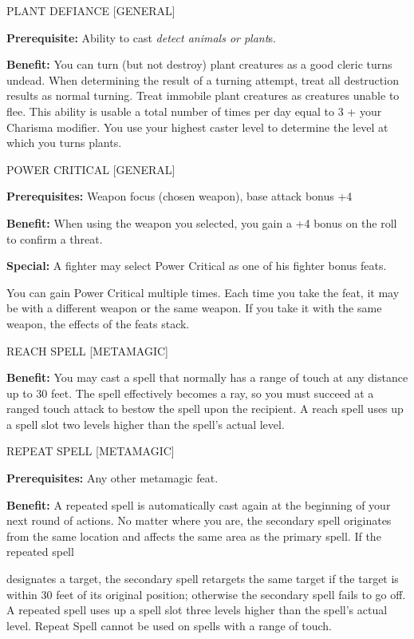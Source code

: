 \documentclass{article}
\begin{document}
\vspace{12pt}
PLANT DEFIANCE [GENERAL]

\textbf{Prerequisite:} Ability to cast \textit{detect animals or plant}s.

\textbf{Benefit:} You can turn (but not destroy) plant creatures as a good cleric 
turns undead. When determining the result of a turning attempt, treat all destruction 
results as normal turning. Treat immobile plant creatures as creatures unable to 
flee. This ability is usable a total number of times per day equal to 3 + your 
Charisma modifier. You use your highest caster level to determine the level at 
which you turns plants.

\vspace{12pt}
POWER CRITICAL [GENERAL]

\textbf{Prerequisites:} Weapon focus (chosen weapon), base attack bonus +4

\textbf{Benefit:} When using the weapon you selected, you gain a +4 bonus on the 
roll to confirm a threat.

\textbf{Special: }A fighter may select Power Critical as one of his fighter bonus 
feats.

You can gain Power Critical multiple times. Each time you take the feat, it may 
be with a different weapon or the same weapon.  If you take it with the same weapon, 
the effects of the feats stack.

\vspace{12pt}
REACH SPELL [METAMAGIC]

\textbf{Benefit:} You may cast a spell that normally has a range of touch at any 
distance up to 30 feet. The spell effectively becomes a ray, so you must succeed 
at a ranged touch attack to bestow the spell upon the recipient. A reach spell 
uses up a spell slot two levels higher than the spell's actual level.

\vspace{12pt}
REPEAT SPELL [METAMAGIC]

\textbf{Prerequisites:} Any other metamagic feat.

\textbf{Benefit:} A repeated spell is automatically cast again at the beginning 
of your next round of actions. No matter where you are, the secondary spell originates 
from the same location and affects the same area as the primary spell. If the repeated 
spell

designates a target, the secondary spell retargets the same target if the target 
is within 30 feet of its original position; otherwise the secondary spell fails 
to go off. A repeated spell uses up a spell slot three levels higher than the spell's 
actual level. Repeat Spell cannot be used on spells with a range of touch.
\end{document}

